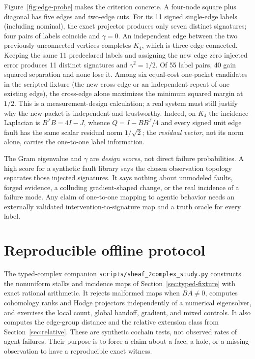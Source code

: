 \documentclass[11pt,a4paper]{article}
\begin{document}
Figure~\ref{fig:edge-probe} makes the criterion concrete. A four-node square plus diagonal has five edges and two-edge cuts. For its 11 signed single-edge labels (including nominal), the exact projector produces only seven distinct signatures; four pairs of labels coincide and $\gamma=0$. An independent edge between the two previously unconnected vertices completes $K_4$, which is three-edge-connected. Keeping the same 11 predeclared labels and assigning the new edge zero injected error produces 11 distinct signatures and $\gamma^2=1/2$. Of 55 label pairs, 40 gain squared separation and none lose it. Among six equal-cost one-packet candidates in the scripted fixture (the new cross-edge or an independent repeat of one existing edge), the cross-edge alone maximizes the minimum squared margin at $1/2$. This is a measurement-design calculation; a real system must still justify why the new packet is independent and trustworthy. Indeed, on $K_4$ the incidence Laplacian is $B^TB=4I-J$, whence $Q=I-BB^T/4$ and every signed unit edge fault has the same scalar residual norm $1/\sqrt{2}$; the \emph{residual vector}, not its norm alone, carries the one-to-one label information.

The Gram eigenvalue and $\gamma$ are \emph{design scores}, not direct failure probabilities. A high score for a synthetic fault library says the chosen observation topology separates those injected signatures. It says nothing about unmodeled faults, forged evidence, a colluding gradient-shaped change, or the real incidence of a failure mode. Any claim of one-to-one mapping to agentic behavior needs an externally validated intervention-to-signature map and a truth oracle for every label.

\section{Reproducible offline protocol}\label{sec:protocol}
The typed-complex companion \texttt{scripts/sheaf\_2complex\_study.py} constructs the nonuniform stalks and incidence maps of Section~\ref{sec:typed-fixture} with exact rational arithmetic. It rejects malformed maps when $BA\ne0$, computes cohomology ranks and Hodge projectors independently of a numerical eigensolver, and exercises the local count, global handoff, gradient, and mixed controls. It also computes the edge-group distance and the relative extension class from Section~\ref{sec:relative}. These are synthetic cochain tests, not observed rates of agent failures. Their purpose is to force a claim about a face, a hole, or a missing observation to have a reproducible exact witness.
\end{document}
